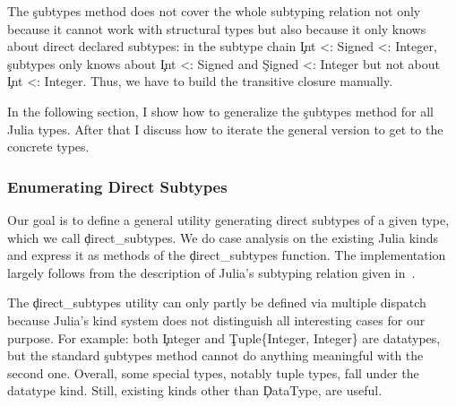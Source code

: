 The \c{subtypes} method does not cover the whole subtyping relation not only
because it cannot work with structural types but also because it only knows
about direct declared subtypes: in the subtype chain \c{Int <: Signed <:
Integer}, \c{subtypes} only knows about \c{Int <: Signed} and \c{Signed <:
Integer} but not about \c{Int <: Integer}. Thus, we have to build
the transitive closure manually.

In the following section, I show how to generalize the \c{subtypes} method
for all Julia types. After that I discuss how to iterate the general version to
get to the concrete types.

\subsubsection{Enumerating Direct Subtypes}

Our goal is to define a general utility generating direct subtypes of a given
type, which we call \c{direct_subtypes}.
We do case analysis on the existing Julia kinds and express it as methods
of the \c{direct_subtypes} function. The implementation largely follows from the
description of Julia's subtyping relation given in~\cite{oopsla18b}.

The \c{direct_subtypes} utility can only partly be defined via multiple dispatch
because Julia's kind system does not distinguish all interesting cases for our purpose.
For example: both \c{Integer} and \c{Tuple\{Integer, Integer\}} are datatypes,
but the standard \c{subtypes} method cannot do anything meaningful with the second one.
%
Overall,
some special types, notably tuple types, fall under the datatype kind. Still,
existing kinds other than \c{DataType}, are useful.

